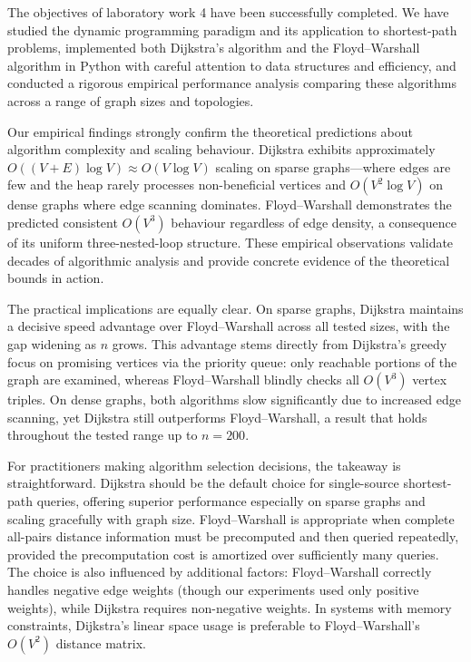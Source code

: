 \documentclass[12pt]{article}
\begin{document}
The objectives of laboratory work 4 have been successfully completed. We have studied
the dynamic programming paradigm and its application to shortest-path problems, implemented both
Dijkstra's algorithm and the Floyd--Warshall algorithm in Python with careful attention to data
structures and efficiency, and conducted a rigorous empirical performance analysis comparing these
algorithms across a range of graph sizes and topologies.

Our empirical findings strongly confirm the theoretical predictions about algorithm complexity and
scaling behaviour. Dijkstra exhibits approximately $O((V+E)\log V) \approx O(V \log V)$ scaling on
sparse graphs---where edges are few and the heap rarely processes non-beneficial vertices and
$O(V^2 \log V)$ on dense graphs where edge scanning dominates. Floyd--Warshall demonstrates the predicted
consistent $O(V^3)$ behaviour regardless of edge density, a consequence of its uniform three-nested-loop
structure. These empirical observations validate decades of algorithmic analysis and provide concrete
evidence of the theoretical bounds in action.

The practical implications are equally clear. On sparse graphs, Dijkstra maintains a decisive speed advantage
over Floyd--Warshall across all tested sizes, with the gap widening as $n$ grows. This advantage stems directly
from Dijkstra's greedy focus on promising vertices via the priority queue: only reachable portions of the graph
are examined, whereas Floyd--Warshall blindly checks all $O(V^3)$ vertex triples. On dense graphs, both algorithms
slow significantly due to increased edge scanning, yet Dijkstra still outperforms Floyd--Warshall, a result that
holds throughout the tested range up to $n=200$.

For practitioners making algorithm selection decisions, the takeaway is straightforward. Dijkstra should be the
default choice for single-source shortest-path queries, offering superior performance especially on sparse graphs
and scaling gracefully with graph size. Floyd--Warshall is appropriate when complete all-pairs distance information
must be precomputed and then queried repeatedly, provided the precomputation cost is amortized over sufficiently
many queries. The choice is also influenced by additional factors: Floyd--Warshall correctly handles negative edge
weights (though our experiments used only positive weights), while Dijkstra requires non-negative weights. In systems
with memory constraints, Dijkstra's linear space usage is preferable to Floyd--Warshall's $O(V^2)$ distance matrix.
\end{document}

